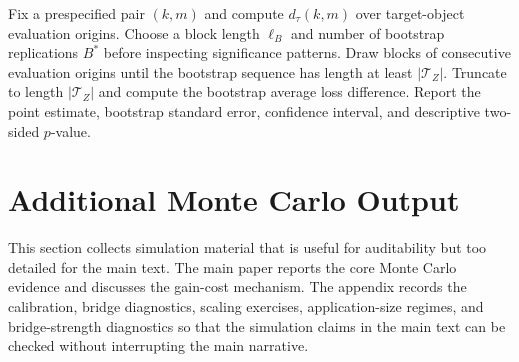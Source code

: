 \documentclass[a4paper,12pt]{article}
\newcommand{\Tcal}{\mathcal{T}}
\newcommand{\1}{\mathbf{1}}
\begin{document}
\begin{algorithm}[H]
\caption{Target-object block bootstrap}
\label{alg:ia_target_bootstrap}
\begin{algorithmic}[1]
\State Fix a prespecified pair $(k,m)$ and compute $d_\tau(k,m)$ over target-object evaluation origins.
\State Choose a block length $\ell_B$ and number of bootstrap replications $B^\ast$ before inspecting significance patterns.
  \State Draw blocks of consecutive evaluation origins until the bootstrap sequence has length at least $|\Tcal_Z|$.
  \State Truncate to length $|\Tcal_Z|$ and compute the bootstrap average loss difference.
\EndFor
\State Report the point estimate, bootstrap standard error, confidence interval, and descriptive two-sided $p$-value.
\end{algorithmic}
\end{algorithm}

\section{Additional Monte Carlo Output}
\label{ia:additional_mc}

This section collects simulation material that is useful for auditability but too detailed for the main text. The main paper reports the core Monte Carlo evidence and discusses the gain-cost mechanism. The appendix records the calibration, bridge diagnostics, scaling exercises, application-size regimes, and bridge-strength diagnostics so that the simulation claims in the main text can be checked without interrupting the main narrative.
\end{document}
